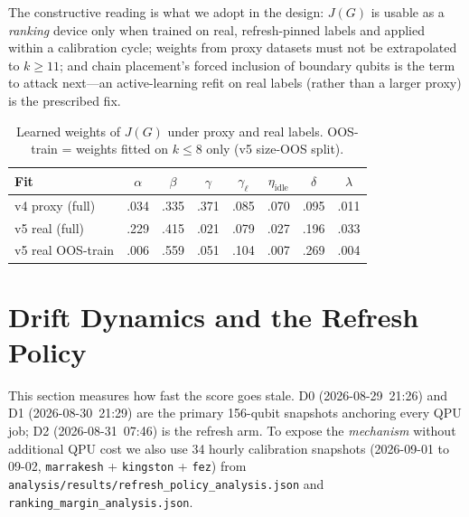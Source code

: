 \documentclass[journal,10pt,twocolumn]{IEEEtran}
\begin{document}
The constructive reading is what we adopt in the design: $J(G)$ is usable as a \emph{ranking} device only when
trained on real, refresh-pinned labels and applied within a calibration cycle; weights from proxy datasets must
not be extrapolated to $k\ge11$; and chain placement's forced inclusion of boundary qubits is the term to attack
next---an active-learning refit on real labels (rather than a larger proxy) is the prescribed fix.

\begin{table}[t]
\caption{Learned weights of $J(G)$ under proxy and real labels. OOS-train = weights fitted on $k\le8$ only
(v5 size-OOS split).}
\label{tab:wgts}
\centering
\footnotesize
\setlength{\tabcolsep}{3pt}
\begin{tabular}{@{}lccccccc@{}}
\toprule
Fit & $\alpha$ & $\beta$ & $\gamma$ & $\gamma_{\ell}$ & $\eta_{\mathrm{idle}}$ & $\delta$ & $\lambda$\\
\midrule
v4 proxy (full) & .034 & .335 & .371 & .085 & .070 & .095 & .011\\
v5 real (full)  & .229 & .415 & .021 & .079 & .027 & .196 & .033\\
v5 real OOS-train & .006 & .559 & .051 & .104 & .007 & .269 & .004\\
\bottomrule
\end{tabular}
\end{table}

\section{Drift Dynamics and the Refresh Policy}
\label{sec:drift}
This section measures how fast the score goes stale. D0 (2026-08-29~21:26) and D1 (2026-08-30~21:29) are the
primary 156-qubit snapshots anchoring every QPU job; D2 (2026-08-31~07:46) is the refresh arm. To expose the
\emph{mechanism} without additional QPU cost we also use 34 hourly calibration snapshots (2026-09-01 to 09-02,
\texttt{marrakesh} + \texttt{kingston} + \texttt{fez}) from \texttt{analysis/results/refresh\_policy\_analysis.json}
and \texttt{ranking\_margin\_analysis.json}.
\end{document}
